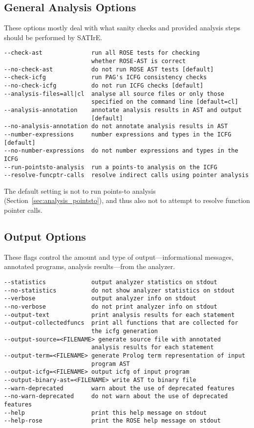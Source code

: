 \documentclass[a4paper,12pt]{report}
\begin{document}
\subsection{General Analysis Options}

These options mostly deal with what sanity checks and provided analysis
steps should be performed by SATIrE.

{\footnotesize
\begin{verbatim}
--check-ast              run all ROSE tests for checking
                         whether ROSE-AST is correct
--no-check-ast           do not run ROSE AST tests [default]
--check-icfg             run PAG's ICFG consistency checks
--no-check-icfg          do not run ICFG checks [default]
--analysis-files=all|cl  analyse all source files or only those
                         specified on the command line [default=cl]
--analysis-annotation    annotate analysis results in AST and output
                         [default]
--no-analysis-annotation do not annotate analysis results in AST
--number-expressions     number expressions and types in the ICFG [default]
--no-number-expressions  do not number expressions and types in the ICFG
--run-pointsto-analysis  run a points-to analysis on the ICFG
--resolve-funcptr-calls  resolve indirect calls using pointer analysis
\end{verbatim}
}

The default setting is not to run points-to analysis
(Section~\ref{sec:analysis_pointsto}), and thus also not to attempt to
resolve function pointer calls.

\subsection{Output Options}

These flags control the amount and type of output---informational messages,
annotated programs, analysis results---from the analyzer.

{\footnotesize
\begin{verbatim}
--statistics             output analyzer statistics on stdout
--no-statistics          do not show analyzer statistics on stdout
--verbose                output analyzer info on stdout
--no-verbose             do not print analyzer info on stdout
--output-text            print analysis results for each statement
--output-collectedfuncs  print all functions that are collected for
                         the icfg generation
--output-source=<FILENAME> generate source file with annotated 
                         analysis results for each statement
--output-term=<FILENAME> generate Prolog term representation of input
                         program AST
--output-icfg=<FILENAME> output icfg of input program
--output-binary-ast=<FILENAME> write AST to binary file
--warn-deprecated        warn about the use of deprecated features
--no-warn-deprecated     do not warn about the use of deprecated features
--help                   print this help message on stdout
--help-rose              print the ROSE help message on stdout
\end{verbatim}
}
\end{document}

